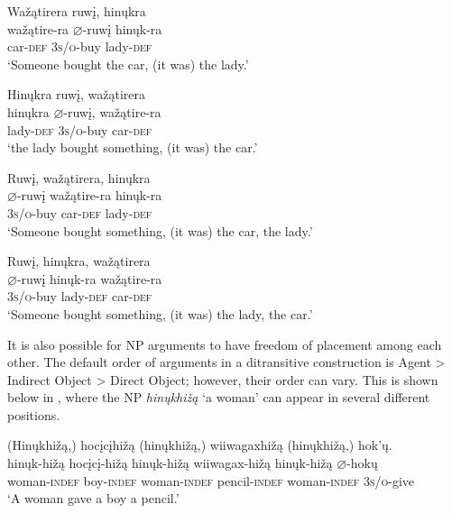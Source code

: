 \documentclass[output=paper]{LSP/langsci}
\begin{document}
\ex\label{ex:jrs:12b}
\glll Wa\v{z}ątirera		ruw\k{i},			hin\k{u}kra\\
wa\v{z}ątire-ra	$\varnothing$-ruw\k{i}	hin\k{u}k-ra \\
car-\textsc{def} 			\textsc{3s/o}-buy 	lady-\textsc{def} \\
\trans `Someone bought the car, (it was) the lady.' 

\ex\label{ex:jrs:12c}
\glll Hin\k{u}kra 		ruw\k{i}, 		wa\v{z}ątirera \\
hin\k{u}kra 	$\varnothing$-ruw\k{i}, 		wa\v{z}ątire-ra \\
lady-\textsc{def} \textsc{3s/o}-buy car-\textsc{def} \\
\trans `the lady bought something, (it was) the car.' 

\ex\label{ex:jrs:12d}
\glll Ruw\k{i}, 		wa\v{z}ątirera,	hin\k{u}kra\\
$\varnothing$-ruw\k{i}	wa\v{z}ątire-ra	hin\k{u}k-ra \\
\textsc{3s/o}-buy car-\textsc{def} lady-\textsc{def} \\
\trans `Someone bought something, (it was) the car, the lady.' 

\ex\label{ex:jrs:12e}
\glll Ruw\k{i}, 		hin\k{u}kra, 	wa\v{z}ątirera \\
$\varnothing$-ruw\k{i} 	hin\k{u}k-ra 	wa\v{z}ątire-ra \\ 
\textsc{3s/o}-buy lady-\textsc{def} car-\textsc{def} \\
\trans `Someone bought something, (it was) the lady, the car.'
\z
\z

It is also possible for NP arguments to have freedom of placement among each other. The default order of arguments in a ditransitive construction is Agent > Indirect Object > Direct Object; however, their order can vary.  This is shown below in , where the  NP \textit{hin\k{u}khi\v{z}ą} `a woman' can appear in several different positions.

\ea\label{ex:jrs:13}
\glll (Hin\k{u}khi\v{z}ą,) 	hoc\k{i}c\k{i}hi\v{z}ą 	(hin\k{u}khi\v{z}ą,) wiiwagaxhi\v{z}ą 	(hin\k{u}khi\v{z}ą,) hok'\k{u}.\\
hin\k{u}k-hi\v{z}ą 		hoc\k{i}c\k{i}-hi\v{z}ą 	hin\k{u}k-hi\v{z}ą 		wiiwagax-hi\v{z}ą 	hin\k{u}k-hi\v{z}ą 	$\varnothing$-hok\k{u}\\
	woman-\textsc{indef}	boy-\textsc{indef} 	woman-\textsc{indef} 	pencil-\textsc{indef} 	woman-\textsc{indef} 	\textsc{3s/o}-give\\
\trans `A woman gave a boy a pencil.'
\z
	
\end{document}
